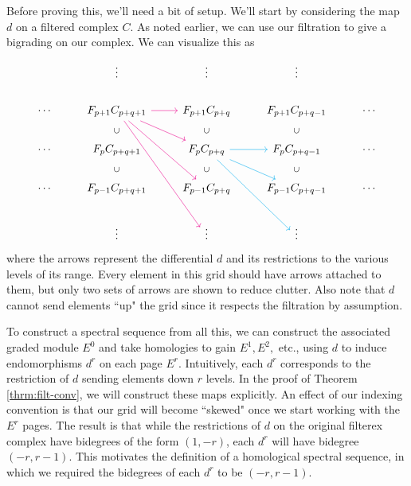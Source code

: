 \documentclass[twoside,10pt]{article}
\begin{document}
Before proving this, we'll need a bit of setup. We'll start by considering the map $d$ on a filtered complex $C$. As noted earlier, we can use our filtration to give a bigrading on our complex. We can visualize this as
\[
	\begin{tikzcd}
                &\vdots&\vdots&\vdots\\
                \cdots&F_{p+1}C_{p+q+1}\arrow[r,magenta]\arrow[rd,magenta]\arrow[rdd,magenta]\arrow[rddd,magenta]&F_{p+1}C_{p+q}&F_{p+1}C_{p+q-1}&\cdots\\
                \cdots&F_{p}C_{p+q+1}\arrow[draw=none]{u}[sloped,auto=false]{\subset}&F_{p}C_{p+q}\arrow[r,cyan]\arrow[rd,cyan]\arrow[rdd,cyan]\arrow[draw=none]{u}[sloped,auto=false]{\subset}&F_{p}C_{p+q-1}\arrow[draw=none]{u}[sloped,auto=false]{\subset}&\cdots\\
                \cdots&F_{p-1}C_{p+q+1}\arrow[draw=none]{u}[sloped,auto=false]{\subset}&F_{p-1}C_{p+q}\arrow[draw=none]{u}[sloped,auto=false]{\subset}&F_{p-1}C_{p+q-1}\arrow[draw=none]{u}[sloped,auto=false]{\subset}&\cdots\\
                               &\vdots&\vdots&\vdots
        \end{tikzcd}
\] 
where the arrows represent the differential $d$ and its restrictions to the various levels of its range. Every element in this grid should have arrows attached to them, but only two sets of arrows are shown to reduce clutter. Also note that $d$ cannot send elements ``up" the grid since it respects the filtration by assumption.

To construct a spectral sequence from all this, we can construct the associated graded module $E^{0}$ and take homologies to gain $E^{1}, E^{2},$ etc., using $d$ to induce endomorphisms $d^{r}$ on each page $E^{r}$. Intuitively, each $d^{r}$ corresponds to the restriction of $d$ sending elements down $r$ levels. In the proof of Theorem \ref{thrm:filt-conv}, we will construct these maps explicitly. An effect of our indexing convention is that our grid will become ``skewed" once we start working with the $E^{r}$ pages. The result is that while the restrictions of $d$ on the original filterex complex have bidegrees of the form $(1,-r)$, each $d^{r}$ will have bidegree $(-r,r-1)$. This motivates the definition of a homological spectral sequence, in which we required the bidegrees of each $d^{r}$ to be $(-r,r-1)$.
\end{document}
